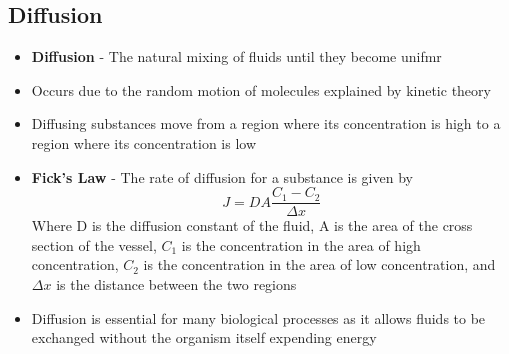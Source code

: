 \subsection{Diffusion}
\begin{itemize}
    \item \textbf{Diffusion} - The natural mixing of fluids until they become unifmr
    \item Occurs due to the random motion of molecules explained by kinetic theory
    \item Diffusing substances move from a region where its concentration is high to a region where its concentration is low
    \item \textbf{Fick's Law} - The rate of diffusion for a substance is given by \[J=DA\frac{C_1-C_2}{\Delta x}\] Where D is the diffusion constant of the fluid, A is the area of the cross section of the vessel, \(C_1\) is the concentration in the area of high concentration, \(C_2\) is the concentration in the area of low concentration, and \(\Delta x\) is the distance between the two regions
    \item Diffusion is essential for many biological processes as it allows fluids to be exchanged without the organism itself expending energy
\end{itemize}

\newpage
